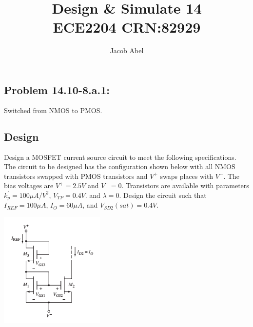 \documentclass[12pt,letterpaper,titlepage]{article}
\author{Jacob Abel}
\title{	Design \& Simulate 14
	\\\large ECE2204 CRN:82929
}
\begin{document}
\maketitle
\begin{raggedright}

\section{Problem 14.10-8.a.1: } Switched from NMOS to PMOS.
\subsection{Design}

Design a MOSFET current source circuit to meet the following specifications. The circuit to be designed has the configuration shown below with all NMOS transistors swapped with PMOS transistors and $V^+$ swaps places with $V^-$.  The bias voltages are $V^+ = 2.5V$ and $V^-=0$. Transistors are available with parameters $k_p^\prime = 100\mu A/V^2$, $V_{TP} = 0.4V$. and $\lambda = 0$. Design the circuit such that $I_{REF} = 100\mu A$, $I_O = 60\mu A$, and $V_{SD2}(sat) = 0.4V$.

\begin{center}
\begin{paracol}{2}
\centering
\includegraphics[width=\textwidth, height=12\baselineskip, keepaspectratio=true]{ds1}


\end{paracol}
\end{center}
\end{raggedright}
\end{document}
